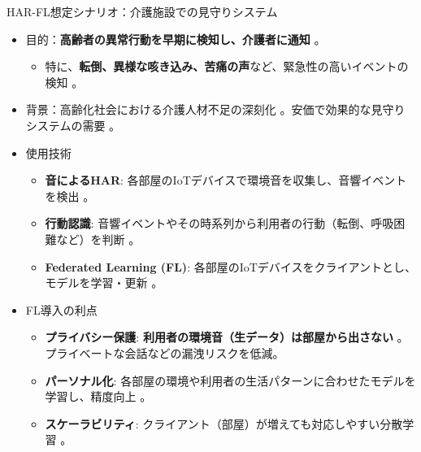 \documentclass[unicode,12pt,aspectratio=169,dvipdfmx]{beamer}
\begin{document}
\begin{frame}{HAR-FL想定シナリオ：介護施設での見守りシステム}
    \begin{itemize}
        \item 目的：\textbf{高齢者の異常行動を早期に検知し、介護者に通知} \cite{Source515}。
        \begin{itemize}
            \item 特に、\textbf{転倒、異様な咳き込み、苦痛の声}など、緊急性の高いイベントの検知 \cite{Source516, Source519}。
        \end{itemize}
        \item 背景：高齢化社会における介護人材不足の深刻化 \cite{Source2}。安価で効果的な見守りシステムの需要 \cite{Source523}。
        \item 使用技術
        \begin{itemize}
            \item \textbf{音によるHAR}: 各部屋のIoTデバイスで環境音を収集し、音響イベントを検出 \cite{Source516}。
            \item \textbf{行動認識}: 音響イベントやその時系列から利用者の行動（転倒、呼吸困難など）を判断 \cite{Source516}。
            \item \textbf{Federated Learning (FL)}: 各部屋のIoTデバイスをクライアントとし、モデルを学習・更新 \cite{Source516}。
        \end{itemize}
        \item FL導入の利点 \cite{Source516}
        \begin{itemize}
            \item \textbf{プライバシー保護}: \textbf{利用者の環境音（生データ）は部屋から出さない} \cite{Source516}。プライベートな会話などの漏洩リスクを低減。
            \item \textbf{パーソナル化}: 各部屋の環境や利用者の生活パターンに合わせたモデルを学習し、精度向上 \cite{Source418, Source514}。
            \item \textbf{スケーラビリティ}: クライアント（部屋）が増えても対応しやすい分散学習 \cite{Source517}。
        \end{itemize}
    \end{itemize}
\end{frame}
\end{document}
